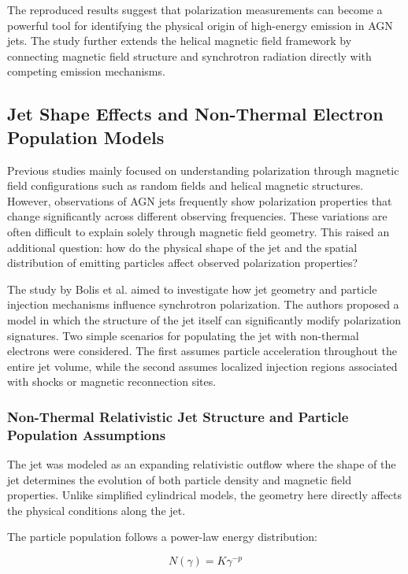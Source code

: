 \documentclass{article}
\begin{document}
The reproduced results suggest that polarization measurements can become a powerful tool for identifying the physical origin of high-energy emission in AGN jets. The study further extends the helical magnetic field framework by connecting magnetic field structure and synchrotron radiation directly with competing emission mechanisms.

\subsection{Jet Shape Effects and Non-Thermal Electron Population Models}


Previous studies mainly focused on understanding polarization through magnetic field configurations such as random fields and helical magnetic structures. However, observations of AGN jets frequently show polarization properties that change significantly across different observing frequencies. These variations are often difficult to explain solely through magnetic field geometry. This raised an additional question: how do the physical shape of the jet and the spatial distribution of emitting particles affect observed polarization properties?

The study by Bolis et al. aimed to investigate how jet geometry and particle injection mechanisms influence synchrotron polarization. The authors proposed a model in which the structure of the jet itself can significantly modify polarization signatures. Two simple scenarios for populating the jet with non-thermal electrons were considered. The first assumes particle acceleration throughout the entire jet volume, while the second assumes localized injection regions associated with shocks or magnetic reconnection sites.


\subsubsection{Non-Thermal Relativistic Jet Structure and Particle Population Assumptions}

The jet was modeled as an expanding relativistic outflow where the shape of the jet determines the evolution of both particle density and magnetic field properties. Unlike simplified cylindrical models, the geometry here directly affects the physical conditions along the jet.

The particle population follows a power-law energy distribution:

\begin{equation}
N(\gamma)
=
K\gamma^{-p}
\end{equation}
\end{document}
